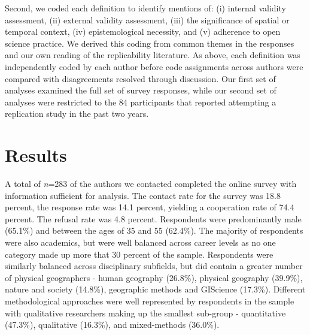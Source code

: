 \documentclass[]{interact}
\theoremstyle{plain}%
\theoremstyle{definition}
\theoremstyle{remark}
\begin{document}
Second, we coded each definition to identify mentions of: (i) internal validity assessment, (ii) external validity assessment, (iii) the significance of spatial or temporal context, (iv) epistemological necessity, and (v) adherence to open science practice.
We derived this coding from common themes in the responses and our own reading of the replicability literature.
As above, each definition was independently coded by each author before code assignments across authors were compared with disagreements resolved through discussion.
Our first set of analyses examined the full set of survey responses, while our second set of analyses were restricted to the 84 participants that reported attempting a replication study in the past two years.

\section*{Results}
A total of \textit{n}=283 of the authors we contacted completed the online survey with information sufficient for analysis. 
The contact rate for the survey was 18.8 percent, the response rate was 14.1 percent, yielding a cooperation rate of 74.4 percent. 
The refusal rate was 4.8 percent.
Respondents were predominantly male (65.1\%) and between the ages of 35 and 55 (62.4\%). 
The majority of respondents were also academics, but were well balanced across career levels as no one category made up more that 30 percent of the sample.
Respondents were similarly balanced across disciplinary subfields, but did contain a greater number of physical geographers  - human geography (26.8\%), physical geography (39.9\%), nature and society (14.8\%), geographic methods and GIScience (17.3\%). 
Different methodological approaches were well represented by respondents in the sample with qualitative researchers making up the smallest sub-group  - quantitative (47.3\%), qualitative (16.3\%), and mixed-methods (36.0\%).

\end{document}
